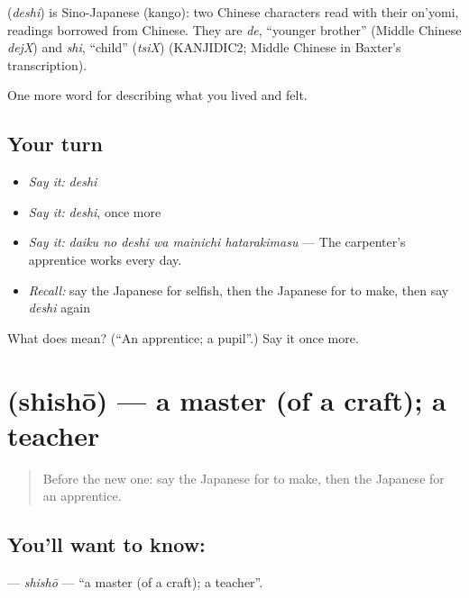 \begin{cousinweb}
\textbf{} (\emph{deshi}) is Sino-Japanese (kango): two Chinese characters read with their on'yomi, readings borrowed from Chinese. They are \emph{de}, \textquotedblleft{}younger brother\textquotedblright{} (Middle Chinese \emph{dejX}) and \emph{shi}, \textquotedblleft{}child\textquotedblright{} (\emph{tsiX}) (KANJIDIC2; Middle Chinese in Baxter's transcription).
\end{cousinweb}

\begin{grammarlens}[title={What you've built}]
One more word for describing what you lived and felt.
\end{grammarlens}

\subsection*{Your turn}
\begin{itemize}
\raggedright
  \item \emph{Say it:} \emph{deshi}
  \item \emph{Say it:} \emph{deshi}, once more
  \item \emph{Say it:} \emph{daiku no deshi wa mainichi hatarakimasu} — The carpenter's apprentice works every day.
  \item \emph{Recall:} say the Japanese for selfish, then the Japanese for to make, then say \emph{deshi} again
\end{itemize}

\begin{tcolorbox}[breakable,colback=teal!4,colframe=teal!35!black,title={Before you move on}]
What does  mean? (\textquotedblleft{}An apprentice; a pupil\textquotedblright{}.) Say it once more.
\end{tcolorbox}
\section[\texorpdfstring{\ja{ししょう} (shishō)}{ししょう (shishō)}]{ (shishō) — a master (of a craft); a teacher}

\label{lesson:JA-C480-shishou}



\begin{quote}
Before the new one: say the Japanese for to make, then the Japanese for an apprentice.
\end{quote}

\subsection*{You'll want to know: }
\textbf{} — \emph{shishō} — \textquotedblleft{}a master (of a craft); a teacher\textquotedblright{}.

